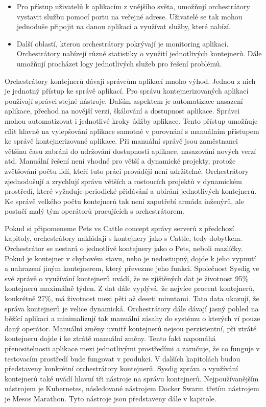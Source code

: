 \begin{itemize}
\item Pro přístup uživatelů k aplikacím z vnějšího světa, umožňují orchestrátory vystavit službu pomocí portu na veřejné adrese. Uživatelé se tak mohou jednoduše připojit na danou aplikaci a využívat služby, které nabízí. 
\item Další oblastí, kterou orchestrátory pokrývají je monitoring aplikací. Orchestrátory nabízejí různé statistiky o využití jednotlivých kontejnerů. Dále umožňují procházet logy jednotlivých služeb pro řešení problémů. 
\end{itemize}
\par
Orchestrátory kontejnerů dávají správcům aplikací mnoho výhod. Jednou z nich je jednotný přístup ke správě aplikací. Pro správu kontejnerizovaných aplikací používají správci stejné nástroje. Dalším aspektem je automatizace nasazení aplikace, přechod na novější verzi, škálování a dostupnost aplikace. Správci mohou automatizovat i jednotlivé kroky údžby aplikace. Tento přístup umožňuje cílit hlavně na vylepšování aplikace samotné v porovnání s manuálním přístupem ke správě kontejnerizované aplikace. Při manuální správě jsou zaměstnanci většinu času zabráni do udržování dostupnosti aplikace, nasazování nových verzí atd. Manuální řešení není vhodné pro větší a dynamické projekty, protože zvětšování počtu lidí, kteří tuto práci provádějí není udržitelné. Orchestrátory zjednodušují a zrychlují správu větších a rostoucích projektů v dynamickém prostředí, které vyžaduje periodické přidávání a ubírání jednotlivých kontejnerů. Ke správě velkého počtu kontejnerů tak není zapotřebí armáda inženýrů, ale postačí malý tým operátorů pracujících s orchestrátorem. \par
    Pokud si připomeneme Pets vs Cattle concept správy serverů z předchozí kapitoly, orchestrátory nakládají s kontejnery jako s Cattle, tedy dobytkem. Orchestrátor se nestará o jednotlivé kontejnery jako o Pets, neboli mazlíčky. Pokud je kontejner v chybovém stavu, nebo je nedostupný, dojde k jeho vypnutí a nahrazení jiným kontejnerem, který převezme jeho funkci. Společnost Sysdig ve své zprávě o využívání kontejnerů \cite{sysdig} uvádí, že ze zjištěných dat je životnost 95\% kontejnerů maximálně týden. Z dat dále vyplývá, že nejvíce procent kontejnerů, konkrétně 27\%,  má životnost mezi pěti až deseti minutami. Tato data ukazují, že správa kontejnerů je velice dynamická. Orchestrátory dále dávají jasný pohled na běžící aplikaci a minimalizují tak manuální zásahy do systému o kterých ví pouze daný operátor. Manuální změny uvnitř kontejnerů nejsou perzistentní, při ztrátě kontejneru dojde i ke ztrátě manuální změny. Tento fakt napomáhá přenositelnosti aplikace mezi jednotlivými prostředími a zaručuje, že co funguje v testovacím prostředí bude fungovat v produkci. V dalších kapitolách budou představeny konkrétní orchestrátory kontejnerů. Sysdig zpráva o využívání kontejnerů \cite{sysdig} také uvádí hlavní tři nástroje na správu kontejnerů. Nejpoužívanějším nástrojem je Kubernetes, následované nástrojem Docker Swarm třetím nástrojem je Mesos Marathon. Tyto nástroje jsou představeny dále v kapitole.

